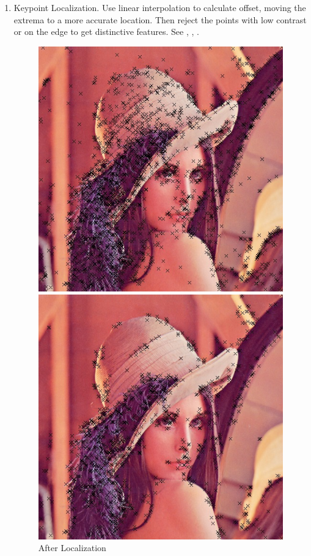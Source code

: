 \begin{enumerate}
  \item Keypoint Localization.
    Use linear interpolation to calculate offset,
    moving the extrema to a more accurate location.
    Then reject the points with low contrast or on the edge to get distinctive features.
    See , , .
    \begin{figure}[H]
      \begin{minipage}[b]{0.46\linewidth}
        \centering
        \includegraphics[scale=0.4]{res/feature_after_offset.png}
        \caption{After Localization \label{fig:feature1}}
      \end{minipage}
      \hspace{1em}
      \begin{minipage}[b]{0.46\linewidth}
        \centering
        \includegraphics[scale=0.4]{res/feature_after_contrast.png}

\end{minipage}
\end{figure}
\end{enumerate}
